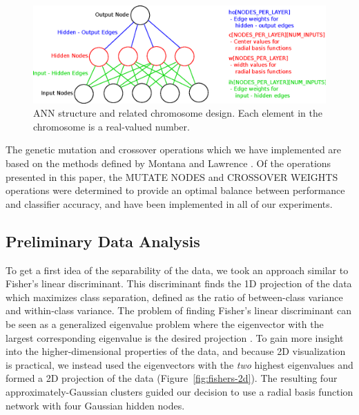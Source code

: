 \documentclass[11pt]{article}       %
\begin{document}
\begin{figure}[h]
	\centering
	\includegraphics[width=\textwidth]{ann-chromosome}
	\caption{ANN structure and related chromosome design.  Each element in the chromosome is a real-valued number.}
	\label{fig:ann-chromosome}
\end{figure}

The genetic mutation and crossover operations which we have implemented are based on the methods defined by Montana and Lawrence \cite{GA-ANN}. Of the operations presented in this paper, the MUTATE NODES and CROSSOVER WEIGHTS operations were determined to provide an optimal balance between performance and classifier accuracy, and have been implemented in all of our experiments.

\subsection{Preliminary Data Analysis} \label{prelim}
To get a first idea of the separability of the data, we took an approach similar to Fisher's linear discriminant. This discriminant finds the 1D projection of the data which maximizes class separation, defined as the ratio of between-class variance and within-class variance. The problem of finding Fisher's linear discriminant can be seen as a generalized eigenvalue problem where the eigenvector with the largest corresponding eigenvalue is the desired projection \cite[\S 3.8.2]{Duda}.
To gain more insight into the higher-dimensional properties of the data, and because 2D visualization is practical, we instead used the eigenvectors with the \emph{two} highest eigenvalues and formed a 2D projection of the data (Figure~\ref{fig:fishers-2d}). The resulting four approximately-Gaussian clusters guided our decision to use a radial basis function network with four Gaussian hidden nodes.
\end{document}
